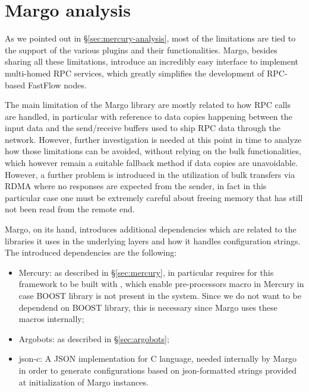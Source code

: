 \section{Margo analysis}
As we pointed out in \S\ref{sec:mercury-analysis}, most of the limitations are tied to the support of the various plugins and their functionalities. Margo, besides sharing all these limitations, introduce an incredibly easy interface to implement multi-homed RPC services, which greatly simplifies the development of RPC-based FastFlow nodes.\newline

The main limitation of the Margo library are mostly related to how RPC calls are handled, in particular with reference to data copies happening between the input data and the send/receive buffers used to ship RPC data through the network. However, further investigation is needed at this point in time to analyze how those limitations can be avoided, without relying on the bulk functionalities, which however remain a suitable fallback method if data copies are unavoidable. However, a further problem is introduced in the utilization of bulk transfers via RDMA where no responses are expected from the sender, in fact in this particular case one must be extremely careful about freeing memory that has still not been read from the remote end.\newline

Margo, on its hand, introduces additional dependencies which are related to the libraries it uses in the underlying layers and how it handles configuration strings. The introduced dependencies are the following:
\begin{itemize}
    \item Mercury: as described in \S\ref{sec:mercury}, in particular requires for this framework to be built with , which enable pre-processors macro in Mercury in case BOOST library is not present in the system. Since we do not want to be dependend on BOOST library, this is necessary since Margo uses these macros internally;
    \item Argobots: as described in \S\ref{sec:argobots};
    \item json-c: A JSON implementation for C language\cite{jsonc}, needed internally by Margo in order to generate configurations based on json-formatted strings provided at initialization of Margo instances.
\end{itemize}